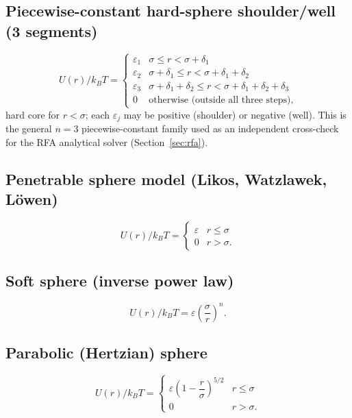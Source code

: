 \documentclass[11pt,a4paper]{article}
\begin{document}
\subsection{Piecewise-constant hard-sphere shoulder/well (3 segments)}
\begin{equation}
  U(r)/k_BT =
  \begin{cases}
    \varepsilon_1 & \sigma\le r<\sigma+\delta_1\\
    \varepsilon_2 & \sigma+\delta_1\le r<\sigma+\delta_1+\delta_2\\
    \varepsilon_3 & \sigma+\delta_1+\delta_2\le r<\sigma+\delta_1+\delta_2+\delta_3\\
    0 & \text{otherwise (outside all three steps)},
  \end{cases}
\end{equation}
hard core for $r<\sigma$; each $\varepsilon_j$ may be positive (shoulder) or
negative (well). This is the general $n=3$ piecewise-constant family used as
an independent cross-check for the RFA analytical solver
(Section~\ref{sec:rfa}).

\subsection{Penetrable sphere model (Likos, Watzlawek, L\"owen) \cite{likos1998}}
\begin{equation}
  U(r)/k_BT = \begin{cases}\varepsilon & r\le\sigma\\ 0 & r>\sigma.\end{cases}
\end{equation}

\subsection{Soft sphere (inverse power law)}
\begin{equation}
  U(r)/k_BT = \varepsilon\left(\frac{\sigma}{r}\right)^{n}.
\end{equation}

\subsection{Parabolic (Hertzian) sphere}
\begin{equation}
  U(r)/k_BT = \begin{cases}\varepsilon\left(1-\dfrac{r}{\sigma}\right)^{5/2} & r\le\sigma\\ 0 & r>\sigma.\end{cases}
\end{equation}
\end{document}
